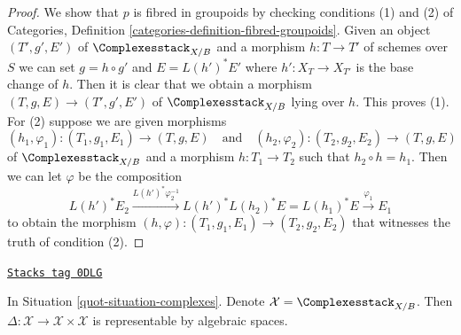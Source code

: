 \begin{proof}
We show that $p$ is fibred in groupoids by checking conditions
(1) and (2) of Categories, Definition
\ref{categories-definition-fibred-groupoids}.
Given an object $(T', g', E')$
of $\Complexesstack_{X/B}$ and a morphism $h : T \to T'$ of
schemes over $S$ we can set $g = h \circ g'$ and
$E = L(h')^*E'$ where $h' : X_T \to X_{T'}$
is the base change of $h$. Then it is clear that we obtain
a morphism $(T, g, E) \to (T', g', E')$
of $\Complexesstack_{X/B}$ lying over $h$. This proves (1).
For (2) suppose we are given morphisms
$$
(h_1, \varphi_1) : (T_1, g_1, E_1) \to (T, g, E)
\quad\text{and}\quad
(h_2, \varphi_2) : (T_2, g_2, E_2) \to (T, g, E)
$$
of $\Complexesstack_{X/B}$ and a morphism $h : T_1 \to T_2$ such that
$h_2 \circ h = h_1$. Then we can let $\varphi$ be the composition
$$
L(h')^*E_2
\xrightarrow{L(h')^*\varphi_2^{-1}}
L(h')^*L(h_2)^*E = L(h_1)^*E
\xrightarrow{\varphi_1}
E_1
$$
to obtain the morphism
$(h, \varphi) : (T_1, g_1, E_1) \to (T_2, g_2, E_2)$
that witnesses the truth of condition (2).
\end{proof}

\begin{lemma}
\label{quot-lemma-complexes-diagonal}
\href{https://stacks.math.columbia.edu/tag/0DLG}{\texttt{Stacks tag 0DLG}}

In Situation \ref{quot-situation-complexes}. Denote
$\mathcal{X} = \Complexesstack_{X/B}$. Then
$\Delta : \mathcal{X} \to \mathcal{X} \times \mathcal{X}$ is
representable by algebraic spaces.
\end{lemma}

